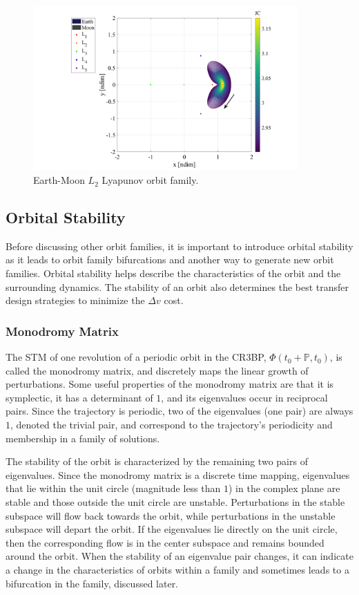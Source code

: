 \begin{figure}[ht]
    \centering
    \includegraphics[width=0.9\textwidth]{figures/L2LyapunovFamily.pdf}
    \caption{Earth-Moon $L_{2}$ Lyapunov orbit family.}
    \label{fig:L2Lyapunov}
\end{figure}

\subsection{Orbital Stability}
Before discussing other orbit families, it is important to introduce orbital stability as it leads
to orbit family bifurcations and another way to generate new orbit families. Orbital stability
helps describe the characteristics of the orbit and the surrounding dynamics. The stability of an
orbit also determines the best transfer design strategies to minimize the $\Delta v$ cost. 

\subsubsection{Monodromy Matrix}
The STM of one revolution of a periodic orbit in the CR3BP, $\Phi(t_{0}+\mathbb{P},t_{0})$, is
called the monodromy matrix, and discretely maps the linear growth of perturbations. Some
useful properties of the monodromy matrix are that it is symplectic, it has a determinant of $1$,
and its eigenvalues occur in reciprocal pairs\cite{ZimovanSpreen:2021}. Since the trajectory is
periodic, two of the eigenvalues (one pair) are always $1$, denoted the trivial pair, and
correspond to the trajectory's periodicity and membership in a family of solutions.

The stability of the orbit is characterized by the remaining two pairs of eigenvalues. Since the
monodromy matrix is a discrete time mapping, eigenvalues that lie within the unit circle (magnitude
less than $1$) in the complex plane are stable and those outside the unit circle are unstable.
Perturbations in the stable subspace will flow back towards the orbit, while perturbations in the
unstable subspace will depart the orbit. If the eigenvalues lie directly on the unit circle, then
the corresponding flow is in the center subspace and remains bounded around the orbit. When the
stability of an eigenvalue pair changes, it can indicate a change in the characteristics of orbits
within a family and sometimes leads to a bifurcation in the family, discussed later.

